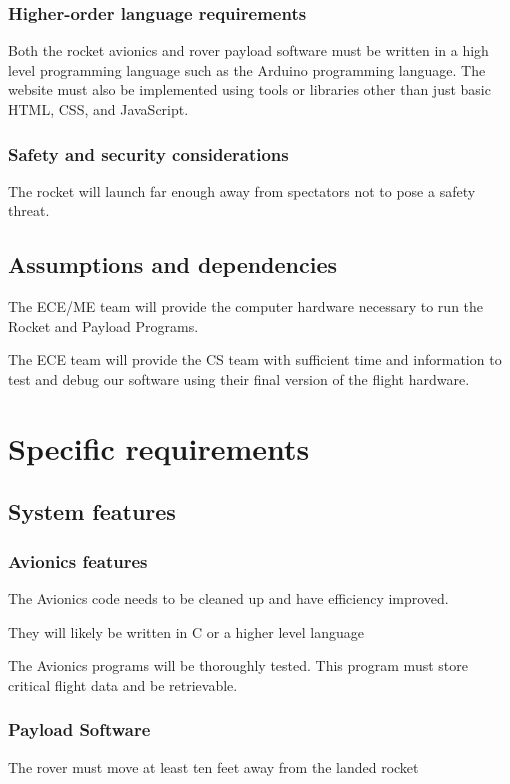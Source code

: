 \documentclass[onecolumn, draftclsnofoot, 10pt, compsoc]{IEEEtran}
\begin{document}
\subsubsection{Higher-order language requirements}
Both the rocket avionics and rover payload software must be written in a high level programming language such as the Arduino programming language. The website must also be implemented using tools or libraries other than just basic HTML, CSS, and JavaScript.

\subsubsection{Safety and security considerations}
The rocket will launch far enough away from spectators not to pose a safety threat.

\subsection{Assumptions and dependencies}
The ECE/ME team will provide the computer hardware necessary to run the Rocket and Payload Programs. 

The ECE team will provide the CS team with sufficient time and information to test and debug our software using their final version of the flight hardware.

\section{Specific requirements}
\subsection{System features}
\subsubsection{Avionics features}
The Avionics code needs to be cleaned up and have efficiency improved. 

They will likely be written in C or a higher level language

The Avionics programs will be thoroughly tested. This program must store critical flight data and be retrievable. 

\subsubsection{Payload Software}
The rover must move at least ten feet away from the landed rocket
\end{document}
